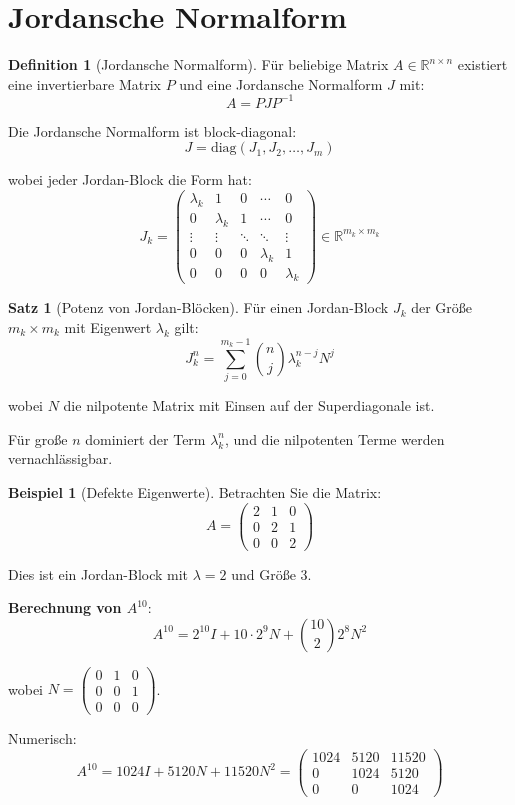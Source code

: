 \documentclass[a4paper,12pt]{report}
\theoremstyle{definition}
\newtheorem{definition}{Definition}
\newtheorem{beispiel}{Beispiel}
\newtheorem{satz}{Satz}
\begin{document}
	\section{Jordansche Normalform}
	
	\begin{definition}[Jordansche Normalform]
		Für beliebige Matrix $A \in \mathbb{R}^{n \times n}$ existiert eine invertierbare Matrix $P$ und eine Jordansche Normalform $J$ mit:
		\[
		A = P J P^{-1}
		\]
		
		Die Jordansche Normalform ist block-diagonal:
		\[
		J = \text{diag}(J_1, J_2, \ldots, J_m)
		\]
		
		wobei jeder Jordan-Block die Form hat:
		\[
		J_k = \begin{pmatrix}
			\lambda_k & 1 & 0 & \cdots & 0 \\
			0 & \lambda_k & 1 & \cdots & 0 \\
			\vdots & \vdots & \ddots & \ddots & \vdots \\
			0 & 0 & 0 & \lambda_k & 1 \\
			0 & 0 & 0 & 0 & \lambda_k
		\end{pmatrix} \in \mathbb{R}^{m_k \times m_k}
		\]
	\end{definition}
	
	\begin{satz}[Potenz von Jordan-Blöcken]
		Für einen Jordan-Block $J_k$ der Größe $m_k \times m_k$ mit Eigenwert $\lambda_k$ gilt:
		\[
		J_k^n = \sum_{j=0}^{m_k-1} \binom{n}{j} \lambda_k^{n-j} N^j
		\]
		
		wobei $N$ die nilpotente Matrix mit Einsen auf der Superdiagonale ist.
		
		Für große $n$ dominiert der Term $\lambda_k^n$, und die nilpotenten Terme werden vernachlässigbar.
	\end{satz}
	
	\begin{beispiel}[Defekte Eigenwerte]
		Betrachten Sie die Matrix:
		\[
		A = \begin{pmatrix}
			2 & 1 & 0 \\
			0 & 2 & 1 \\
			0 & 0 & 2
		\end{pmatrix}
		\]
		
		Dies ist ein Jordan-Block mit $\lambda = 2$ und Größe 3.
		
		\textbf{Berechnung von $A^{10}$}:
		\[
		A^{10} = 2^{10} I + 10 \cdot 2^9 N + \binom{10}{2} 2^8 N^2
		\]
		
		wobei $N = \begin{pmatrix} 0 & 1 & 0 \\ 0 & 0 & 1 \\ 0 & 0 & 0 \end{pmatrix}$.
		
		Numerisch:
		\[
		A^{10} = 1024 I + 5120 N + 11520 N^2 = \begin{pmatrix}
			1024 & 5120 & 11520 \\
			0 & 1024 & 5120 \\
			0 & 0 & 1024
		\end{pmatrix}
		\]
	\end{beispiel}
	
\end{document}
